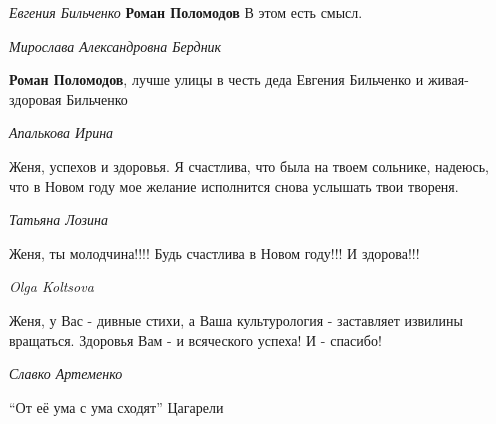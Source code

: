 \emph{Евгения Бильченко}
\textbf{Роман Поломодов} В этом есть смысл.

\emph{Мирослава Александровна Бердник}

\textbf{Роман Поломодов}, лучше улицы в честь деда Евгения Бильченко и живая-здоровая Бильченко

\emph{Апалькова Ирина}

Женя, успехов и здоровья. Я счастлива, что была на твоем сольнике, надеюсь, что
в Новом году мое желание исполнится снова услышать твои твореня.

\emph{Татьяна Лозина}

Женя, ты молодчина!!!! Будь счастлива в Новом году!!! И здорова!!!

\emph{Olga Koltsova}

Женя, у Вас - дивные стихи, а Ваша культурология - заставляет извилины
вращаться. Здоровья Вам - и всяческого успеха! И - спасибо!

\emph{Славко Артеменко}

\enquote{От её ума с ума сходят} Цагарели
